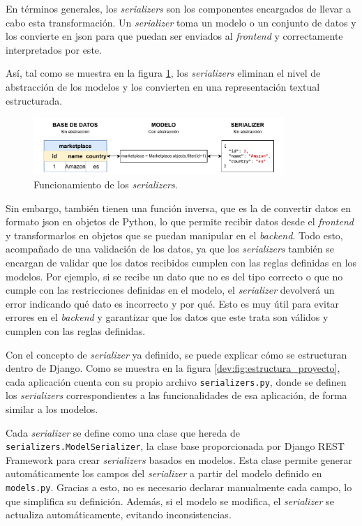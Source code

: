 En términos generales, los \textit{serializers} son los componentes encargados de llevar a cabo esta transformación. Un \textit{serializer} toma un modelo o un conjunto de datos y los convierte en \gls{json} para que puedan ser enviados al \textit{frontend} y correctamente interpretados por este.

Así, tal como se muestra en la figura \ref{dev:fig:serializer}, los \textit{serializers} eliminan el nivel de abstracción de los modelos y los convierten en una representación textual estructurada.

\begin{figure}[H]
    \centering
    \includegraphics[width=0.85\textwidth]{figures/design_develop/serializers.pdf}
    \caption{Funcionamiento de los \textit{serializers}.}
    \label{dev:fig:serializer}
\end{figure}

Sin embargo, también tienen una función inversa, que es la de convertir datos en formato \gls{json} en objetos de Python, lo que permite recibir datos desde el \textit{frontend} y transformarlos en objetos que se puedan manipular en el \textit{backend}. Todo esto, acompañado de una validación de los datos, ya que los \textit{serializers} también se encargan de validar que los datos recibidos cumplen con las reglas definidas en los modelos. Por ejemplo, si se recibe un dato que no es del tipo correcto o que no cumple con las restricciones definidas en el modelo, el \textit{serializer} devolverá un error indicando qué dato es incorrecto y por qué. Esto es muy útil para evitar errores en el \textit{backend} y garantizar que los datos que este trata son válidos y cumplen con las reglas definidas.

Con el concepto de \textit{serializer} ya definido, se puede explicar cómo se estructuran dentro de Django. Como se muestra en la figura \ref{dev:fig:estructura_proyecto}, cada aplicación cuenta con su propio archivo \texttt{serializers.py}, donde se definen los \textit{serializers} correspondientes a las funcionalidades de esa aplicación, de forma similar a los modelos.

Cada \textit{serializer} se define como una clase que hereda de \texttt{serializers.ModelSerializer}, la clase base proporcionada por Django REST Framework para crear \textit{serializers} basados en modelos. Esta clase permite generar automáticamente los campos del \textit{serializer} a partir del modelo definido en \texttt{models.py}. Gracias a esto, no es necesario declarar manualmente cada campo, lo que simplifica su definición. Además, si el modelo se modifica, el \textit{serializer} se actualiza automáticamente, evitando inconsistencias.

